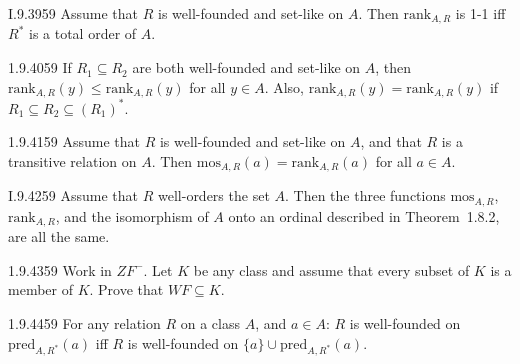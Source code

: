 \begin{lexcopy}{I.9.39}{59}
Assume that $R$ is well-founded and set-like on $A$. Then
\(\textrm{rank}_{A,R}\) is 1-1 iff \(R^*\) is a total order of $A$.
\end{lexcopy}
\unfinished

\begin{lexcopy}{1.9.40}{59}
If \(R_1 \subseteq R_2\) are both well-founded and set-like on $A$, then
\(\textrm{rank}_{A,R}(y) \leq \textrm{rank}_{A,R}(y)\)
for all \(y \in A\). Also, 
\(\textrm{rank}_{A,R}(y) = \textrm{rank}_{A,R}(y)\)
if \(R_1 \subseteq R_2 \subseteq (R_1)^*\).
\end{lexcopy}
\unfinished

\begin{lexcopy}{1.9.41}{59}
Assume that $R$ is well-founded and set-like on $A$, and that $R$
is a transitive relation on $A$.
Then \(\textrm{mos}_{A,R}(a) = \textrm{rank}_{A,R}(a)\) for all \(a \in A\).
\end{lexcopy}
\unfinished

\begin{lexcopy}{I.9.42}{59}
Assume that $R$ well-orders the set $A$. Then the three 
functions \(\textrm{mos}_{A,R}\), \(\textrm{rank}_{A,R}\),
and the isomorphism of $A$ onto an ordinal described in
Theorem~1.8.2, are all the same.
\end{lexcopy}
\unfinished

\begin{lexcopy}{1.9.43}{59}
Work in \(ZF^-\). Let $K$ be any class and assume that every
subset of $K$ is a member of $K$. Prove that \(WF \subseteq K\).
\end{lexcopy}
\unfinished

\begin{lexcopy}{1.9.44}{59}
For any relation $R$ on a class $A$, and \(a \in A\): $R$
is well-founded on \(\textrm{pred}_{A,R^*}(a)\) iff $R$
is well-founded on \(\{a\} \cup \textrm{pred}_{A,R^*}(a)\).
\end{lexcopy}
\unfinished

